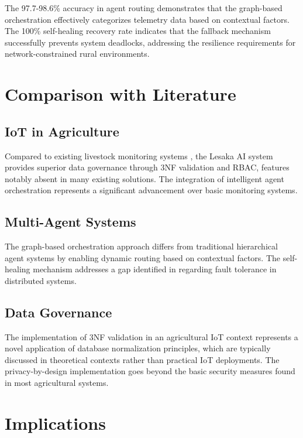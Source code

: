 The 97.7-98.6\% accuracy in agent routing demonstrates that the graph-based orchestration effectively categorizes telemetry data based on contextual factors. The 100\% self-healing recovery rate indicates that the fallback mechanism successfully prevents system deadlocks, addressing the resilience requirements for network-constrained rural environments.

\section{Comparison with Literature}

\subsection{IoT in Agriculture}

Compared to existing livestock monitoring systems \cite{riquelme2018smonitor}, the Lesaka AI system provides superior data governance through 3NF validation and RBAC, features notably absent in many existing solutions. The integration of intelligent agent orchestration represents a significant advancement over basic monitoring systems.

\subsection{Multi-Agent Systems}

The graph-based orchestration approach differs from traditional hierarchical agent systems \cite{wooldridge2009introduction} by enabling dynamic routing based on contextual factors. The self-healing mechanism addresses a gap identified in \cite{ghosh2007self} regarding fault tolerance in distributed systems.

\subsection{Data Governance}

The implementation of 3NF validation in an agricultural IoT context represents a novel application of database normalization principles, which are typically discussed in theoretical contexts rather than practical IoT deployments. The privacy-by-design implementation goes beyond the basic security measures found in most agricultural systems.

\section{Implications}

